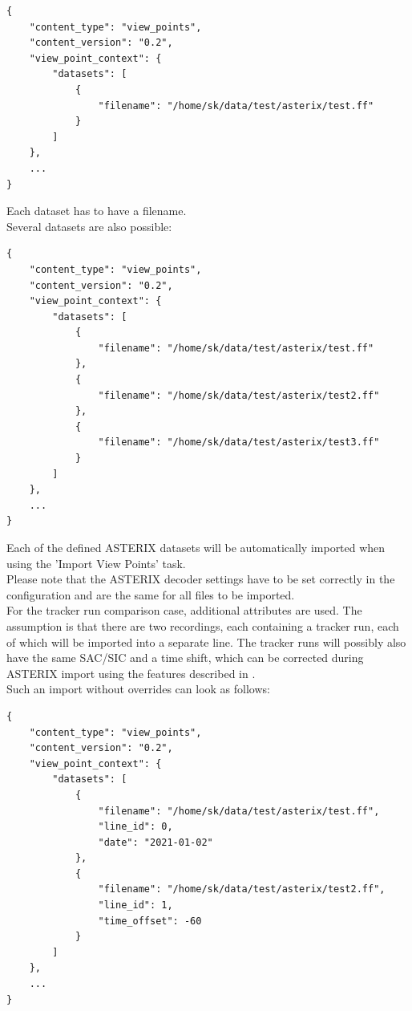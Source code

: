\begin{lstlisting}[basicstyle=\small\ttfamily]
{
    "content_type": "view_points",
    "content_version": "0.2",
    "view_point_context": {
        "datasets": [
            {
                "filename": "/home/sk/data/test/asterix/test.ff"
            }
        ]
    },
    ...
}
\end{lstlisting}

Each dataset has to have a filename. \\

Several datasets are also possible:
\begin{lstlisting}[basicstyle=\small\ttfamily]
{
    "content_type": "view_points",
    "content_version": "0.2",
    "view_point_context": {
        "datasets": [
            {
                "filename": "/home/sk/data/test/asterix/test.ff"
            },
            {
                "filename": "/home/sk/data/test/asterix/test2.ff"
            },
            {
                "filename": "/home/sk/data/test/asterix/test3.ff"
            }
        ]
    },
    ...
}
\end{lstlisting}

Each of the defined ASTERIX datasets will be automatically imported when using the 'Import View Points' task. \\

Please note that the ASTERIX decoder settings have to be set correctly in the configuration and are the same for all files to be imported. \\

For the tracker run comparison case, additional attributes are used. The assumption is that there are two recordings, each containing a tracker run, each of which will be imported into a separate line. 
The tracker runs will possibly also have the same SAC/SIC and a time shift, which can be corrected during ASTERIX import using the features described in . \\

Such an import without overrides can look as follows:

\begin{lstlisting}[basicstyle=\small\ttfamily]
{
    "content_type": "view_points",
    "content_version": "0.2",
    "view_point_context": {
        "datasets": [
            {
                "filename": "/home/sk/data/test/asterix/test.ff",
                "line_id": 0,
                "date": "2021-01-02"
            },
            {
                "filename": "/home/sk/data/test/asterix/test2.ff",
                "line_id": 1,
                "time_offset": -60
            }
        ]
    },
    ...
}
\end{lstlisting}

